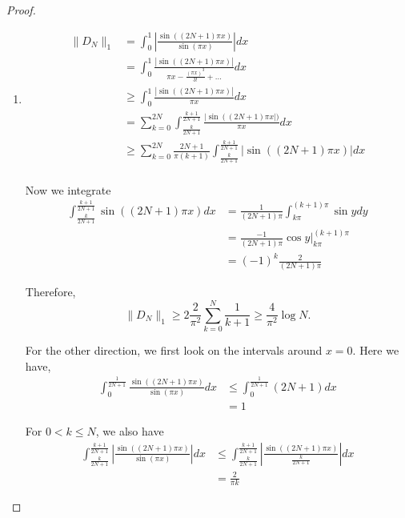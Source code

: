 \documentclass[a4paper]{article}
\begin{document}
\begin{enumerate}
\begin{proof}
\begin{enumerate}
    \item
      \begin{align*}
        \| D_N \|_1 &= \int_{0}^{1} \left| \frac{\sin \left( (2N+1) \pi x \right)}{\sin (\pi x)} \right| dx \\
        &= \int_{0}^{1} \frac{ | \sin \left( ( 2N+1 ) \pi x \right) |}{ \pi x - \frac{(\pi x)^3}{3!} + \dots} dx \\
        &\geq \int_{0}^{1} \frac{| \sin \left( ( 2N+1 ) \pi x \right) |}{\pi x} dx \\
        &= \sum_{k=0}^{2N} \int_{\frac{k}{2N+1}}^{\frac{k+1}{2N+1}} \frac{| \sin \left( ( 2N+1 ) \pi x \right |)}{\pi x} dx \\
        &\geq \sum_{k = 0}^{2N} \frac{2N+1}{\pi (k+1)} \int_{\frac{k}{2N+1}}^{\frac{k+1}{2N+1}} | \sin \left( (2N+1) \pi x \right) | dx \\
      \end{align*}

      Now we integrate
      \begin{align*}
        \int_{\frac{k}{2N+1}}^{\frac{k+1}{2N+1}} \sin \left( (2N+1) \pi x \right) dx &= \frac{1}{(2N+1)\pi} \int_{k \pi}^{ (k+1) \pi } \sin y dy \\
        &= \frac{-1}{(2N+1) \pi} \cos y \big|_{k\pi}^{(k+1)\pi} \\
        &= (-1)^k \frac{2}{(2N+1) \pi}
      \end{align*}

      Therefore,
      \[ \| D_N \|_1 \geq 2 \frac{2}{\pi^2} \sum_{k=0}^{N} \frac{1}{k+1} \geq \frac{4}{\pi^2} \log N .\]

      For the other direction, we first look on the intervals around $x = 0$. Here we have,
      \begin{align*}
        \int_{0}^{\frac{1}{2N+1}} \frac{\sin\left( (2N+1)\pi x \right)}{\sin ( \pi x)} dx &\leq \int_{0}^{\frac{1}{2N+1}} (2N+1) dx \\
        &= 1
      \end{align*}

      For $0<k\leq N$, we also have
      \begin{align*}
        \int_{\frac{k}{2N+1}}^{\frac{k+1}{2N+1}} \left| \frac{\sin\left( (2N+1) \pi x \right)}{\sin ( \pi x )} \right| dx
        &\leq \int_{\frac{k}{2N+1}}^{\frac{k+1}{2N+1}} \left| \frac{\sin\left( (2N+1) \pi x \right)}{\frac{k}{2N+1}} \right| dx \\
        &= \frac{2}{\pi k}
      \end{align*}


\end{enumerate}
\end{proof}
\end{enumerate}
\end{document}
